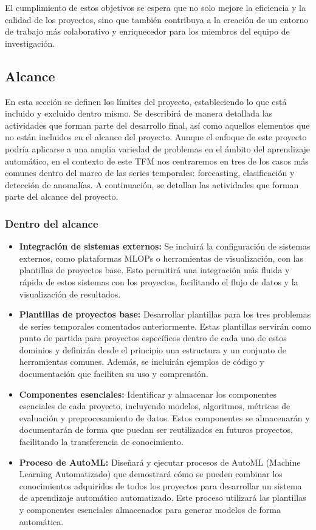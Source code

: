 El cumplimiento de estos objetivos se espera que no solo mejore la eficiencia y la calidad de los 
proyectos, sino que también contribuya a la creación de un entorno de trabajo más colaborativo y
enriquecedor para los miembros del equipo de investigación.

\subsection{Alcance}
En esta sección se definen los límites del proyecto, estableciendo lo que está
incluido y excluido dentro mismo. Se describirá de manera detallada las
actividades que forman parte del desarrollo final, así como aquellos elementos
que no están incluidos en el alcance del proyecto. Aunque el enfoque de este 
proyecto podría aplicarse a una amplia variedad de problemas en el ámbito del 
aprendizaje automático, en el contexto de este TFM nos centraremos en tres de 
los casos más comunes dentro del marco de las series temporales: forecasting, 
clasificación y detección de anomalías. A continuación, se detallan las 
actividades que forman parte del alcance del proyecto.

\subsubsection{Dentro del alcance}
\begin{itemize}
    \item \textbf{Integración de sistemas externos:} Se incluirá la configuración de sistemas 
    externos, como plataformas MLOPs o herramientas de visualización, con las plantillas 
    de proyectos base. Esto permitirá una integración más fluida y rápida de estos sistemas con 
    los proyectos, facilitando el flujo de datos y la visualización de resultados.
    \item \textbf{Plantillas de proyectos base:} Desarrollar plantillas para 
    los tres problemas de series temporales comentados anteriormente. Estas plantillas 
    servirán como punto de partida para proyectos específicos dentro de cada uno de estos dominios
    y definirán desde el principio una estructura y un conjunto de herramientas comunes. Además,
    se incluirán ejemplos de código y documentación que faciliten su uso y comprensión.
    \item \textbf{Componentes esenciales:} Identificar y almacenar los componentes 
    esenciales de cada proyecto, incluyendo modelos, algoritmos, métricas de evaluación y
    preprocesamiento de datos. Estos componentes se almacenarán y documentarán de forma
    que puedan ser reutilizados en futuros proyectos, facilitando la transferencia de conocimiento.
    \item \textbf{Proceso de AutoML:} Diseñará y ejecutar procesos de AutoML 
    (Machine Learning Automatizado) que demostrará cómo se pueden combinar los conocimientos 
    adquiridos de todos los proyectos para desarrollar un sistema de aprendizaje automático 
    automatizado. Este proceso utilizará las plantillas y componentes esenciales almacenados 
    para generar modelos de forma automática.
\end{itemize}

